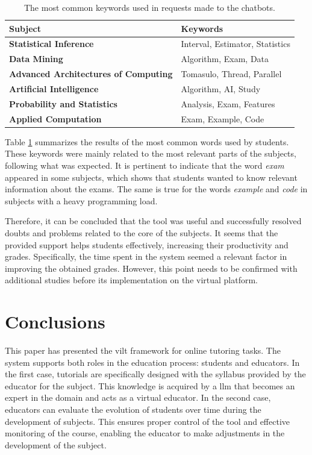 \documentclass[pdflatex,sn-mathphys-num]{sn-jnl}%
\begin{document}
\begin{table}[t!]
	\centering
	\begin{tabular}{|l|l|}
		\hline
		\textbf{Subject}                             & \textbf{Keywords}                 \\ \hline
		\textbf{Statistical Inference}               & Interval, Estimator, Statistics \\ \hline
		\textbf{Data Mining}                         & Algorithm, Exam, Data             \\ \hline
		\textbf{Advanced Architectures of Computing} & Tomasulo, Thread, Parallel         \\ \hline
		\textbf{Artificial Intelligence}             & Algorithm, AI, Study              \\ \hline
		\textbf{Probability and Statistics}          & Analysis, Exam, Features          \\ \hline
		\textbf{Applied Computation}                 & Exam, Example, Code               \\ \hline
	\end{tabular}
	\label{tab:keywords}
	\caption{The most common keywords used in requests made to the chatbots.}
\end{table}

Table \ref{tab:keywords} summarizes the results of the most common words used by students. These keywords were mainly related to the most relevant parts of the subjects, following what was expected. It is pertinent to indicate that the word \emph{exam} appeared in some subjects, which shows that students wanted to know relevant information about the exams. The same is true for the words \emph{example} and \emph{code} in subjects with a heavy programming load.

Therefore, it can be concluded that the tool was useful and successfully resolved doubts and problems related to the core of the subjects. It seems that the provided support helps students effectively, increasing their productivity and grades. Specifically, the time spent in the system seemed a relevant factor in improving the obtained grades. However, this point needs to be confirmed with additional studies before its implementation on the virtual platform.


\section{Conclusions}
\label{sec:conclusions}
This paper has presented the \ac{vilt} framework for online tutoring tasks. The system supports both roles in the education process: students and educators. In the first case, tutorials are specifically designed with the syllabus provided by the educator for the subject. This knowledge is acquired by a \ac{llm} that becomes an expert in the domain and acts as a virtual educator. In the second case, educators can evaluate the evolution of students over time during the development of subjects. This ensures proper control of the tool and effective monitoring of the course, enabling the educator to make adjustments in the development of the subject.
\end{document}
